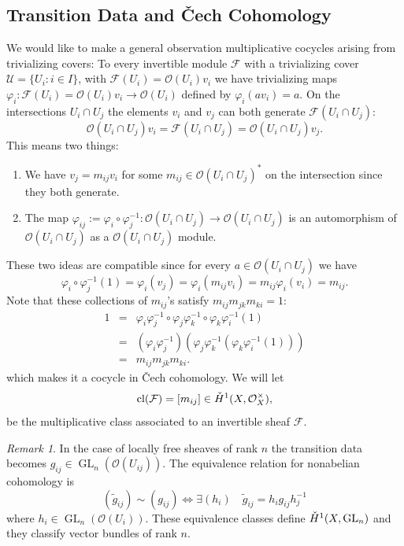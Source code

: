 \documentclass[12pt]{article}
\numberwithin{equation}{section}
\theoremstyle{definition}
\theoremstyle{remark}
\newtheorem{remark}[theorem]{Remark}
\newcommand{\Ocal}{\mathcal{O}}
\newcommand{\Fcal}{\mathcal{F}}
\newcommand{\cl}{\operatorname{cl}}
\newcommand{\Hv}{\Check{H}}
\newcommand{\GL}{\operatorname{GL}}
\begin{document}
\subsection{Transition Data and \v{C}ech Cohomology}
We would like to make a general observation multiplicative cocycles arising from trivializing covers: To every invertible module $\mathcal F$ with a trivializing cover $\mathcal U = \lbrace U_i:i\in I\rbrace$, with $\mathcal F(U_i) = \mathcal O(U_i) v_i $ we have trivializing maps $\varphi_i: \mathcal F(U_i) = \mathcal O(U_i) v_i \to \mathcal O(U_i)$ defined by $\varphi_i(av_i) = a.$
On the intersections $U_i\cap U_j$ the elements $v_i$ and $v_j$ can both generate $\mathcal F(U_i\cap U_j)$:
$$ \mathcal O(U_i\cap U_j) v_i = \mathcal F(U_i\cap U_j) = \mathcal O(U_i\cap U_j) v_j . $$
This means two things: 
\begin{enumerate}
	\item We have $v_j = m_{ij} v_i$ for some $m_{ij}\in \mathcal O(U_i\cap U_j)^*$ on the intersection since they both generate. 
	\item The map $\varphi_{ij}:=\varphi_i \circ \varphi_j^{-1}:\mathcal O(U_i\cap U_j)\to \mathcal O(U_i\cap U_j)$ is an automorphism of $\mathcal O(U_i\cap U_j)$ as a $\mathcal O(U_i\cap U_j)$ module. 
\end{enumerate}
These two ideas are compatible since for every $a\in \mathcal O(U_i\cap U_j)$ we have
\begin{equation}\label{eqn:invertible_shead_to_multiplicative_cocycle}
\varphi_i\circ\varphi_j^{-1}(1) = \varphi_i(v_j) = \varphi_i(m_{ij} v_i) = m_{ij} \varphi_i(v_i) = m_{ij}.
\end{equation}
Note that these collections of $m_{ij}$'s satisfy $m_{ij}m_{jk}m_{ki}=1$:
\begin{eqnarray*}
	1 &=& \varphi_i\varphi_j^{-1}\circ \varphi_j\varphi_k^{-1}\circ \varphi_k\varphi_i^{-1}(1)\\
	&=& (\varphi_i\varphi_j^{-1})( \varphi_j\varphi_k^{-1}( \varphi_k\varphi_i^{-1}(1)))\\
	&=& m_{ij}m_{jk}m_{ki}.
\end{eqnarray*}
which makes it a cocycle in \v{C}ech cohomology.
We will let 
$$ \cl(\Fcal) = [m_{ij}] \in \Check{H}^1(X,\Ocal_X^{\times}),$$
be the multiplicative class associated to an invertible sheaf $\Fcal$.

\begin{remark}
	In the case of locally free sheaves of rank $n$ the transition data becomes $g_{ij} \in \GL_n(\Ocal(U_{ij}))$.
	The equivalence relation for nonabelian cohomology is 
	 $$ (\widetilde{g}_{ij}) \sim (g_{ij}) \iff \exists (h_i) \quad \widetilde{g}_{ij} = h_i g_{ij} h_j^{-1} $$
	where $h_i \in \GL_n(\Ocal(U_i))$. These equivalence classes define $\Hv^1(X,\GL_n)$ and they classify vector bundles of rank $n$.
\end{remark}
\end{document}

